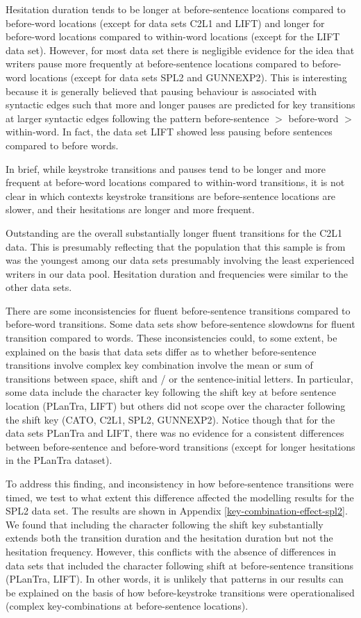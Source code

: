 \documentclass[
  english,
  man,floatsintext]{apa7}
\begin{document}
Hesitation duration tends to be longer at before-sentence locations compared to before-word locations (except for data sets C2L1 and LIFT) and longer for before-word locations compared to within-word locations (except for the LIFT data set). However, for most data set there is negligible evidence for the idea that writers pause more frequently at before-sentence locations compared to before-word locations (except for data sets SPL2 and GUNNEXP2). This is interesting because it is generally believed that pausing behaviour is associated with syntactic edges such that more and longer pauses are predicted for key transitions at larger syntactic edges following the pattern before-sentence \(>\) before-word \(>\) within-word. In fact, the data set LIFT showed less pausing before sentences compared to before words.

In brief, while keystroke transitions and pauses tend to be longer and more frequent at before-word locations compared to within-word transitions, it is not clear in which contexts keystroke transitions are before-sentence locations are slower, and their hesitations are longer and more frequent.

Outstanding are the overall substantially longer fluent transitions for the C2L1 data. This is presumably reflecting that the population that this sample is from was the youngest among our data sets presumably involving the least experienced writers in our data pool. Hesitation duration and frequencies were similar to the other data sets.

There are some inconsistencies for fluent before-sentence transitions compared to before-word transitions. Some data sets show before-sentence slowdowns for fluent transition compared to words. These inconsistencies could, to some extent, be explained on the basis that data sets differ as to whether before-sentence transitions involve complex key combination involve the mean or sum of transitions between space, shift and / or the sentence-initial letters. In particular, some data include the character key following the shift key at before sentence location (PLanTra, LIFT) but others did not scope over the character following the shift key (CATO, C2L1, SPL2, GUNNEXP2). Notice though that for the data sets PLanTra and LIFT, there was no evidence for a consistent differences between before-sentence and before-word transitions (except for longer hesitations in the PLanTra dataset).

To address this finding, and inconsistency in how before-sentence transitions were timed, we test to what extent this difference affected the modelling results for the SPL2 data set. The results are shown in Appendix \ref{key-combination-effect-spl2}. We found that including the character following the shift key substantially extends both the transition duration and the hesitation duration but not the hesitation frequency. However, this conflicts with the absence of differences in data sets that included the character following shift at before-sentence transitions (PLanTra, LIFT). In other words, it is unlikely that patterns in our results can be explained on the basis of how before-keystroke transitions were operationalised (complex key-combinations at before-sentence locations).
\end{document}
